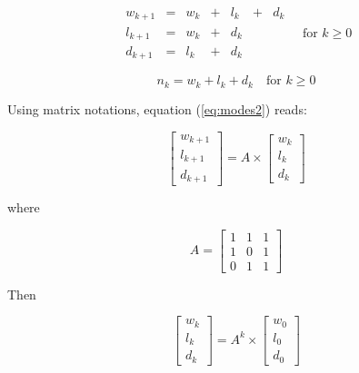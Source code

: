 \begin{equation}
\begin{array}{lllllll}
w_{k+1} & = & w_{k} & + & l_{k} & + & d_{k}\\
l_{k+1} & = & w_{k} & + & d_{k} & & \\
d_{k+1} & = & l_{k} & + & d_{k} & &
\end{array} \quad \text{for }k \geq 0
\label{eq:modes2}
\end{equation}

\begin{equation}
n_{k} = w_{k} + l_{k} + d_{k} \quad \text{for }k \geq 0
\label{eq:modes3}
\end{equation}

Using matrix notations, equation (\ref{eq:modes2}) reads:

\begin{equation}
\left[ \begin{array}{c}
w_{k+1} \\
l_{k+1} \\
d_{k+1} \end{array} \right] = A \times 
\left[ \begin{array}{c}
w_{k} \\
l_{k} \\
d_{k} \end{array} \right]
\label{eq:modes4}
\end{equation}

\noindent where

\begin{equation}
A = \left[ \begin{array}{ccc}
1 & 1 & 1 \\
1 & 0 & 1 \\
0 & 1 & 1 \end{array} \right]
\label{eq:modes5}
\end{equation}

Then 

\begin{equation}
\left[ \begin{array}{c}
w_{k} \\
l_{k} \\
d_{k} \end{array} \right] = A^{k} \times 
\left[ \begin{array}{c}
w_{0} \\
l_{0} \\
d_{0} \end{array} \right]
\label{eq:modes6}
\end{equation}

